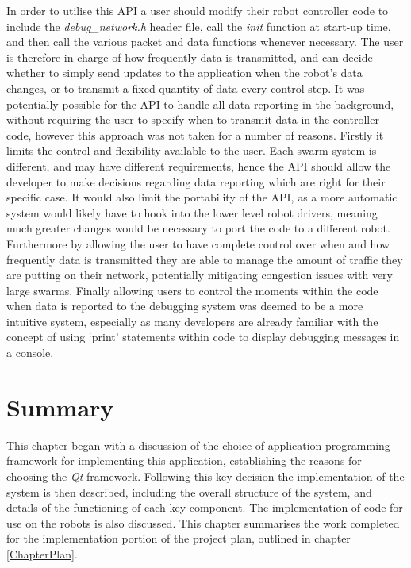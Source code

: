 In order to utilise this API a user should modify their robot controller code to include the \textit{debug\_network.h} header file, call the \textit{init} function at start-up time, and then call the various packet and data functions whenever necessary. The user is therefore in charge of how frequently data is transmitted, and can decide whether to simply send updates to the application when the robot's data changes, or to transmit a fixed quantity of data every control step. It was potentially possible for the API to handle all data reporting in the background, without requiring the user to specify when to transmit data in the controller code, however this approach was not taken for a number of reasons. Firstly it limits the control and flexibility available to the user. Each swarm system is different, and may have different requirements, hence the API should allow the developer to make decisions regarding data reporting which are right for their specific case. It would also limit the portability of the API, as a more automatic system would likely have to hook into the lower level robot drivers, meaning much greater changes would be necessary to port the code to a different robot. Furthermore by allowing the user to have complete control over when and how frequently data is transmitted they are able to manage the amount of traffic they are putting on their network, potentially mitigating congestion issues with very large swarms. Finally allowing users to control the moments within the code when data is reported to the debugging system was deemed to be a more intuitive system, especially as many developers are already familiar with the concept of using `print' statements within code to display debugging messages in a console.


\section{Summary}
This chapter began with a discussion of the choice of application programming framework for implementing this application, establishing the reasons for choosing the \textit{Qt} framework. Following this key decision the implementation of the system is then described, including the overall structure of the system, and details of the functioning of each key component. The implementation of code for use on the robots is also discussed. This chapter summarises the work completed for the implementation portion of the project plan, outlined in chapter \ref{ChapterPlan}.